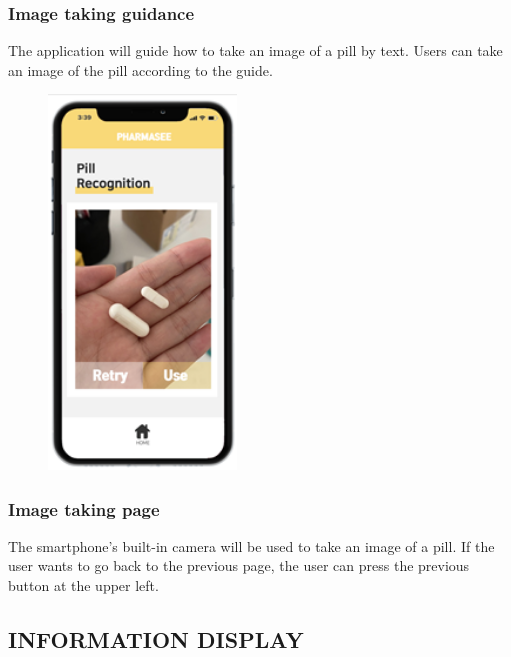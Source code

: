 \documentclass[conference]{IEEEtran}
\begin{document}
\subsubsection{Image taking guidance}The application will guide how to take an image of a pill by text. Users can take an image of the pill according to the guide.\\

\begin{figure}[h!]
\centering
\includegraphics[width=5cm]{imagefolder/pillrecog2.png}
\caption{}
\label{fig:map}
\end{figure}

\subsubsection{Image taking page}The smartphone's built-in camera will be used to take an image of a pill. If the user wants to go back to the previous page, the user can press the previous button at the upper left.\\

\subsection{INFORMATION DISPLAY}\\
\end{document}
